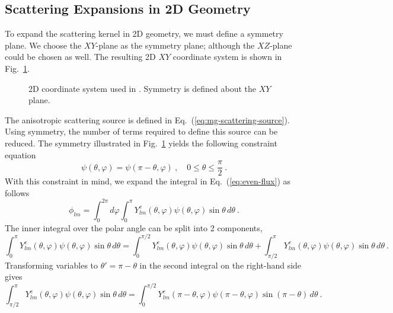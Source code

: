\documentclass{article}
\numberwithin{equation}{subsection}
\begin{document}
\subsection{Scattering Expansions in 2D Geometry}
\label{sec:scatt-expans-2d}

To expand the scattering kernel in 2D geometry, we must define a symmetry
plane.  We choose the $XY$-plane as the symmetry plane; although the
$XZ$-plane could be chosen as well.  The resulting 2D $XY$ coordinate system
is shown in Fig.~\ref{fig:2D_coord}.
\begin{figure}
  \begin{center}
    
  \end{center}
  \caption{2D coordinate system used in \denovo.  Symmetry is defined about
    the $XY$ plane.}
  \label{fig:2D_coord}
\end{figure}
The anisotropic scattering source is defined in
Eq.~(\ref{eq:mg-scattering-source}).  Using symmetry, the number of terms
required to define this source can be reduced.  The symmetry illustrated in
Fig.~\ref{fig:2D_coord} yields the following constraint equation
\begin{equation}
  \psi(\theta, \varphi) = \psi(\pi - \theta, \varphi)\:,\quad
  0\le\theta\le\frac{\pi}{2}\:.
\end{equation}
With this constraint in mind, we expand the integral in
Eq.~(\ref{eq:even-flux}) as follows
\begin{equation}
  \phi_{lm} = \int_{0}^{2\pi}d\varphi\int_{0}^{\pi}
  Y^e_{lm}(\theta,\varphi)\psi(\theta,\varphi)\sin\theta\,d\theta\:.
  \label{eq:expanded-even-moment}
\end{equation}
The inner integral over the polar angle can be split into 2 components,
\begin{equation}
    \int_{0}^{\pi}
    Y^e_{lm}(\theta,\varphi)\psi(\theta,\varphi)\sin\theta\,d\theta =
    \int_{0}^{\pi/2}Y^e_{lm}(\theta,\varphi)\psi(\theta,\varphi)
    \sin\theta\,d\theta +
    \int_{\pi/2}^{\pi}Y^e_{lm}(\theta,\varphi)\psi(\theta,\varphi)
    \sin\theta\,d\theta\:.
\end{equation}
Transforming variables to $\theta'=\pi-\theta$ in the second integral on the
right-hand side gives
\begin{equation}
  \int_{\pi/2}^{\pi}Y^e_{lm}(\theta,\varphi)\psi(\theta,\varphi)
  \sin\theta\,d\theta = \int_{0}^{\pi/2}
  Y^e_{lm}(\pi-\theta,\varphi)\psi(\pi-\theta,\varphi)
  \sin(\pi-\theta)\,d\theta\:.
\end{equation}
\end{document}

